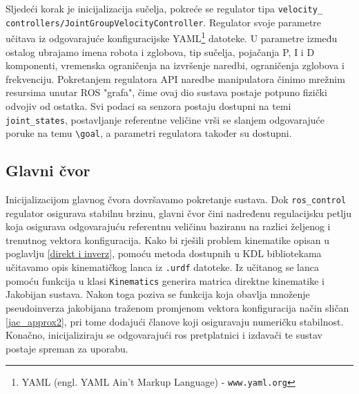 \documentclass[times, utf8, diplomski, numeric]{fer}
\begin{document}
Sljedeći korak je inicijalizacija sučelja, pokreće se regulator tipa \texttt{velocity\_ controllers/JointGroupVelocityController}. 
Regulator svoje parametre učitava iz odgovarajuće konfiguracijske YAML\footnote{YAML (engl. YAML Ain't Markup Language) - \texttt{www.yaml.org}} datoteke.
U parametre između ostalog ubrajamo imena robota i zglobova, tip sučelja, pojačanja P, I i D komponenti, vremenska ograničenja na izvršenje naredbi, ograničenja zglobova i frekvenciju.
Pokretanjem regulatora API naredbe manipulatora činimo mrežnim resursima unutar ROS "grafa", čime ovaj dio sustava postaje potpuno fizički odvojiv od ostatka.
Svi podaci sa senzora postaju dostupni na temi \verb|joint_states|, postavljanje referentne veličine vrši se slanjem odgovarajuće poruke na temu \verb|\goal|, a parametri regulatora također su dostupni.

\subsection{Glavni čvor}
Inicijalizacijom glavnog čvora dovršavamo pokretanje sustava.
Dok \texttt{ros\_control} regulator osigurava stabilnu brzinu, glavni čvor čini nadređenu regulacijsku petlju koja osigurava odgovarajuću referentnu veličinu baziranu na razlici željenog i trenutnog vektora konfiguracija.
Kako bi rješili problem kinematike opisan u poglavlju \ref{direkt i inverz}, pomoću metoda dostupnih u KDL bibliotekama učitavamo opis kinematičkog lanca iz \texttt{.urdf} datoteke.
Iz učitanog se lanca pomoću funkcija u klasi \texttt{Kinematics} generira matrica direktne kinematike i Jakobijan sustava. 
Nakon toga poziva se funkcija koja obavlja množenje pseudoinverza jakobijana traženom promjenom vektora konfiguracija način sličan \ref{jac_approx2}, pri tome dodajući članove koji osiguravaju numeričku stabilnost.
Konačno, inicijaliziraju se odgovarajući ros pretplatnici i izdavači te sustav postaje spreman za uporabu.
\end{document}
